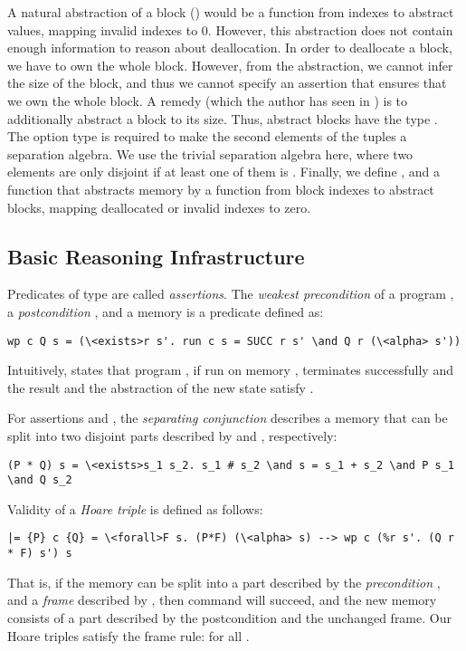 \documentclass[a4paper,oribibl,envcountsame]{llncs}
\begin{document}
A natural abstraction of a block ()
would be a function from indexes to abstract values, mapping invalid indexes to $0$. 
However, this abstraction does not contain enough information to reason about deallocation. 
In order to deallocate a block, we have to own the whole block. However, from the abstraction, we cannot infer the size of the block, and thus we cannot
specify an assertion that ensures that we own the whole block. A remedy (which the author has seen in \cite{App14}) is to additionally 
abstract a block to its size. Thus, abstract blocks have the type . 
The option type is required to make the second elements of the tuples a separation algebra. We use the trivial separation algebra here, where
two elements are only disjoint if at least one of them is . 
Finally, we define , and a function  that abstracts memory
by a function from block indexes to abstract blocks, mapping deallocated or invalid indexes to zero.

\subsection{Basic Reasoning Infrastructure}
Predicates of type  are called \emph{assertions}.
The \emph{weakest precondition} of a program , a \emph{postcondition} , and a memory  is a predicate defined as:
\begin{lstlisting}
wp c Q s = (\<exists>r s'. run c s = SUCC r s' \and Q r (\<alpha> s'))
\end{lstlisting}
Intuitively,  states that program , if run on memory , terminates successfully and the result  and the abstraction of the new 
state  satisfy .

For assertions  and , the \emph{separating conjunction}  describes a memory that can be split into two disjoint parts described by  and , respectively:
\begin{lstlisting}
(P * Q) s = \<exists>s_1 s_2. s_1 # s_2 \and s = s_1 + s_2 \and P s_1 \and Q s_2
\end{lstlisting}
%
Validity of a \emph{Hoare triple}  is defined as follows:
\begin{lstlisting}
|= {P} c {Q} = \<forall>F s. (P*F) (\<alpha> s) --> wp c (%r s'. (Q r * F) s') s
\end{lstlisting}
That is, if the memory can be split into a part described by the \emph{precondition} , and a \emph{frame} described by ,
then command  will succeed, and the new memory consists of a part described by the postcondition  and the unchanged frame. 
Our Hoare triples satisfy the frame rule:  for all .
\end{document}
